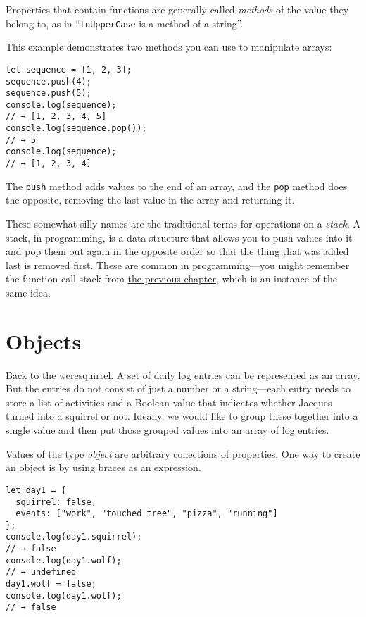 Properties that contain functions are generally called \emph{methods} of the value they belong to, as in ``\lstinline`toUpperCase` is a method of a string''.

\label{data.array_methods}This example demonstrates two methods you can use to manipulate arrays:

\begin{lstlisting}
let sequence = [1, 2, 3];
sequence.push(4);
sequence.push(5);
console.log(sequence);
// → [1, 2, 3, 4, 5]
console.log(sequence.pop());
// → 5
console.log(sequence);
// → [1, 2, 3, 4]
\end{lstlisting}
\noindent{}

The \lstinline`push` method adds values to the end of an array, and the \lstinline`pop` method does the opposite, removing the last value in the array and returning it.

These somewhat silly names are the traditional terms for operations on a \emph{stack}. A stack, in programming, is a data structure that allows you to push values into it and pop them out again in the opposite order so that the thing that was added last is removed first. These are common in programming—you might remember the function call
stack from \hyperref[functions.stack]{the previous chapter}, which is an instance of the same idea.

\section{Objects}

Back to the weresquirrel. A set of daily log entries can be represented as an array. But the entries do not consist of just a number or a string—each entry needs to store a list of activities and a Boolean value that indicates whether Jacques turned into a squirrel or not. Ideally, we would like to group these together into a single value and then put those grouped values into an array of log entries.

Values of the type \emph{object} are arbitrary collections of properties. One way to create an object is by using braces as an expression.

\begin{lstlisting}
let day1 = {
  squirrel: false,
  events: ["work", "touched tree", "pizza", "running"]
};
console.log(day1.squirrel);
// → false
console.log(day1.wolf);
// → undefined
day1.wolf = false;
console.log(day1.wolf);
// → false
\end{lstlisting}
\noindent{}

